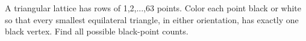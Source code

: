 A triangular lattice has rows of 1,2,...,63 points. Color each point black or white so that every smallest equilateral triangle, in either orientation, has exactly one black vertex. Find all possible black-point counts.

